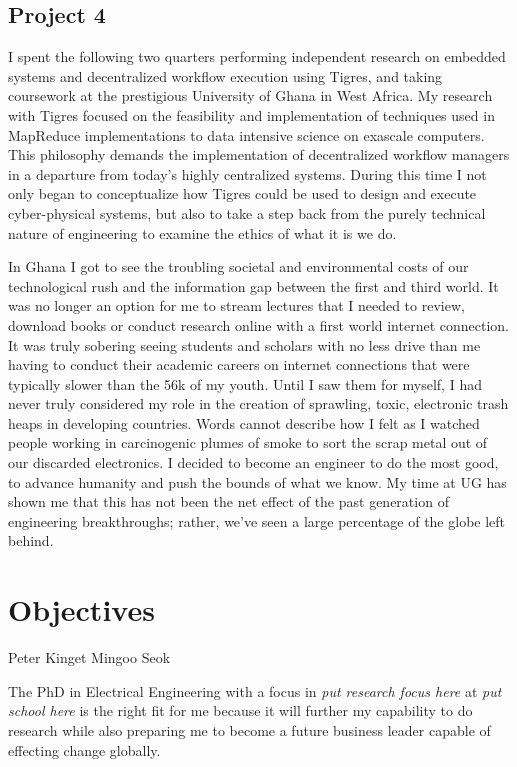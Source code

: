 \documentclass[journal, draftcls]{IEEEtran}
\begin{document}
\subsection{Project 4}
 I spent the following two quarters performing independent research on embedded systems and decentralized workflow execution using Tigres, and taking coursework at the prestigious University of Ghana in West Africa. My research with Tigres  focused on the feasibility and implementation of techniques used in MapReduce implementations to data intensive science on exascale computers. This philosophy demands the implementation of decentralized workflow managers in a departure from today's highly centralized systems. During this time I not only began to conceptualize how Tigres could be used to design and execute cyber-physical systems, but also to take a step back from the purely technical nature of engineering to examine the ethics of what it is we do. 
 
 In Ghana I got to see the troubling societal and environmental costs of our technological rush and the information gap between the first and third world. It was no longer an option for me to stream lectures that I needed to review, download books or conduct research online with a first world internet connection. It was truly sobering seeing students and scholars with no less drive than me having to conduct their academic careers on internet connections that were typically slower than the 56k of my youth. Until I saw them for myself, I had never truly considered my role in the creation of sprawling, toxic, electronic trash heaps in developing countries. Words cannot describe how I felt as I watched people working in carcinogenic plumes of smoke to sort the scrap metal out of our discarded electronics. I decided to become an engineer to do the most good, to advance humanity and push the bounds of what we know. My time at UG has shown me that this has not been the net effect of the past generation of engineering breakthroughs; rather, we've seen a large percentage of the globe left behind. 

\section{Objectives}
Peter Kinget
Mingoo Seok

The PhD in Electrical Engineering with a focus in \textit{{put research focus here}} at \textit{{put school here}} is the right fit for me because it will further my capability to do research while also preparing me to become a future business leader capable of effecting change globally. 
\end{document}
